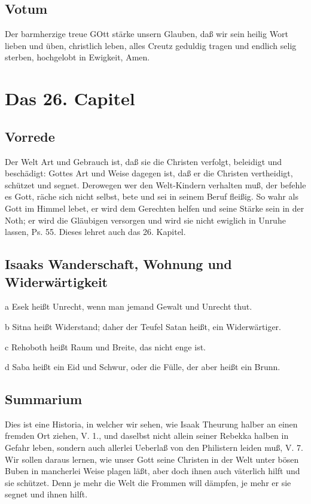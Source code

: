\section{Votum}

Der barmherzige treue GOtt stärke unsern Glauben, daß wir sein heilig Wort lieben und üben, christlich leben, alles Creutz geduldig tragen und endlich selig sterben, hochgelobt in Ewigkeit, Amen.

\chapter{Das 26. Capitel}

\section{Vorrede}

Der Welt Art und Gebrauch ist, daß sie die Christen verfolgt, beleidigt und beschädigt: Gottes Art und Weise dagegen ist, daß er die Christen vertheidigt, schützet und segnet. Derowegen wer den Welt-Kindern verhalten muß, der befehle es Gott, räche sich nicht selbst, bete und sei in seinem Beruf fleißig. So wahr als Gott im Himmel lebet, er wird dem Gerechten helfen und seine Stärke sein in der Noth; er wird die Gläubigen versorgen und wird sie nicht ewiglich in Unruhe lassen, Ps. 55. Dieses lehret auch das 26. Kapitel.

\section{Isaaks Wanderschaft, Wohnung und Widerwärtigkeit}

a Esek heißt Unrecht, wenn man jemand Gewalt und Unrecht thut.

b Sitna heißt Widerstand; daher der Teufel Satan heißt, ein Widerwärtiger.

c Rehoboth heißt Raum und Breite, das nicht enge ist.

d Saba heißt ein Eid und Schwur, oder die Fülle, der aber heißt ein Brunn.

\section{Summarium}

Dies ist eine Historia, in welcher wir sehen, wie Isaak Theurung halber an einen fremden Ort ziehen, V. 1., und daselbst nicht allein seiner Rebekka halben in Gefahr leben, sondern auch allerlei Ueberlaß von den Philistern leiden muß, V. 7. Wir sollen daraus lernen, wie unser Gott seine Christen in der Welt unter bösen Buben in mancherlei Weise plagen läßt, aber doch ihnen auch väterlich hilft und sie schützet. Denn je mehr die Welt die Frommen will dämpfen, je mehr er sie segnet und ihnen hilft.

